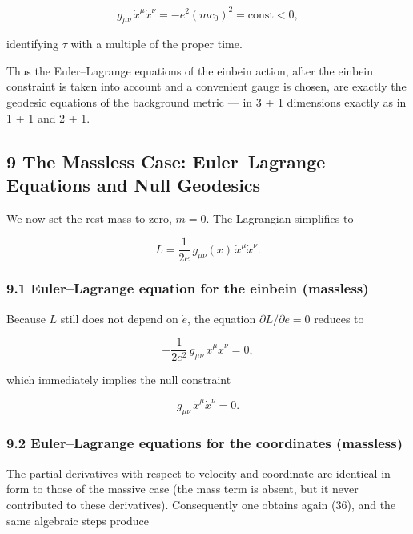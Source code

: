 \documentclass[
]{article}
\begin{document}
\[g_{\mu\nu}\, \dot{x}^{\mu} \dot{x}^{\nu} = - e^{2} (mc_{0})^{2} = \mathrm{const} < 0, \tag{55}\]

identifying \(\tau\) with a multiple of the proper time.

Thus the Euler--Lagrange equations of the einbein action, after the
einbein constraint is taken into account and a convenient gauge is
chosen, are exactly the geodesic equations of the background metric ---
in 3 + 1 dimensions exactly as in 1 + 1 and 2 + 1.

\hypertarget{the-massless-case-eulerlagrange-equations-and-null-geodesics}{%
\subsection{9 The Massless Case: Euler--Lagrange Equations and Null
Geodesics}\label{the-massless-case-eulerlagrange-equations-and-null-geodesics}}

We now set the rest mass to zero, \(m = 0\). The Lagrangian simplifies
to

\[L = \frac{1}{2e}\, g_{\mu\nu}(x)\, \dot{x}^{\mu} \dot{x}^{\nu}. \tag{56}\]

\hypertarget{eulerlagrange-equation-for-the-einbein-massless}{%
\subsubsection{9.1 Euler--Lagrange equation for the einbein
(massless)}\label{eulerlagrange-equation-for-the-einbein-massless}}

Because \(L\) still does not depend on \(\dot{e}\), the equation
\(\partial L / \partial e = 0\) reduces to

\[- \frac{1}{2e^{2}}\, g_{\mu\nu}\, \dot{x}^{\mu} \dot{x}^{\nu} = 0, \tag{57}\]

which immediately implies the null constraint

\[g_{\mu\nu}\, \dot{x}^{\mu} \dot{x}^{\nu} = 0. \tag{58}\]

\hypertarget{eulerlagrange-equations-for-the-coordinates-massless}{%
\subsubsection{9.2 Euler--Lagrange equations for the coordinates
(massless)}\label{eulerlagrange-equations-for-the-coordinates-massless}}

The partial derivatives with respect to velocity and coordinate are
identical in form to those of the massive case (the mass term is absent,
but it never contributed to these derivatives). Consequently one obtains
again (36), and the same algebraic steps produce
\end{document}
